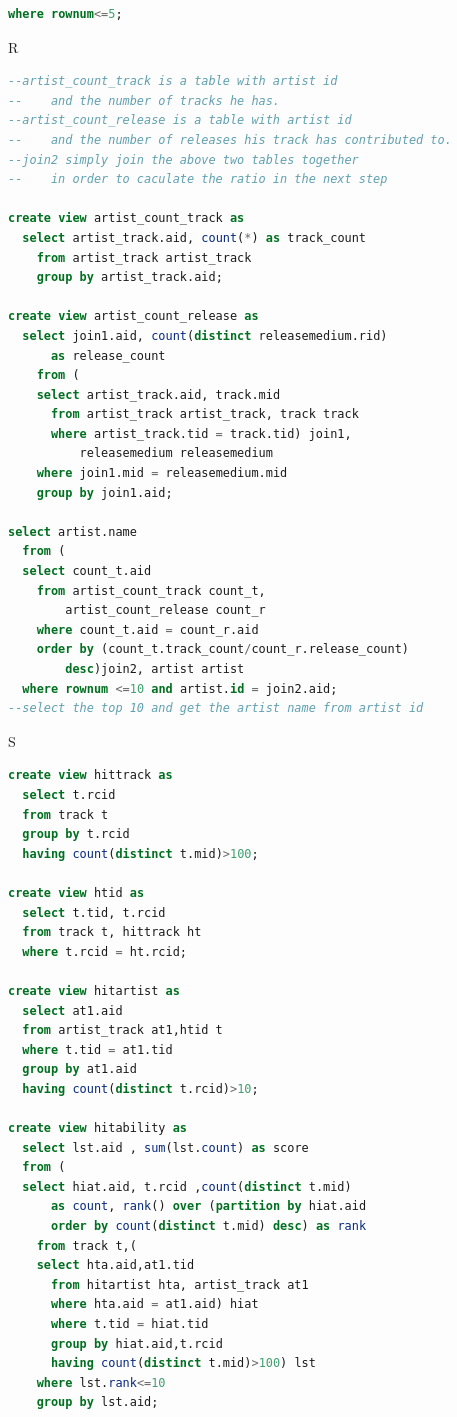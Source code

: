 \documentclass[11pt]{article} %
\begin{document}
{\begin{lstlisting}[language=SQL, keywordstyle=\color{blue!70},
commentstyle=\color{red!50!green!50!blue!50},
rulesepcolor=\color{red!20!green!20!blue!20},
frame=shadowbox]
  where rownum<=5;
\end{lstlisting}
R
\begin{lstlisting}[language=SQL, keywordstyle=\color{blue!70},
commentstyle=\color{red!50!green!50!blue!50},
rulesepcolor=\color{red!20!green!20!blue!20},
frame=shadowbox]
--artist_count_track is a table with artist id
--    and the number of tracks he has.
--artist_count_release is a table with artist id
--    and the number of releases his track has contributed to.
--join2 simply join the above two tables together
--    in order to caculate the ratio in the next step

create view artist_count_track as
  select artist_track.aid, count(*) as track_count
    from artist_track artist_track
    group by artist_track.aid;
            
create view artist_count_release as            
  select join1.aid, count(distinct releasemedium.rid)
      as release_count
    from (
    select artist_track.aid, track.mid
      from artist_track artist_track, track track
      where artist_track.tid = track.tid) join1,
          releasemedium releasemedium
    where join1.mid = releasemedium.mid
    group by join1.aid;
             
select artist.name
  from (
  select count_t.aid
    from artist_count_track count_t,
        artist_count_release count_r
    where count_t.aid = count_r.aid
    order by (count_t.track_count/count_r.release_count)
        desc)join2, artist artist
  where rownum <=10 and artist.id = join2.aid;
--select the top 10 and get the artist name from artist id
\end{lstlisting}
S
\begin{lstlisting}[language=SQL, keywordstyle=\color{blue!70},
commentstyle=\color{red!50!green!50!blue!50},
rulesepcolor=\color{red!20!green!20!blue!20},
frame=shadowbox]
create view hittrack as
  select t.rcid
  from track t
  group by t.rcid
  having count(distinct t.mid)>100;

create view htid as
  select t.tid, t.rcid
  from track t, hittrack ht
  where t.rcid = ht.rcid;

create view hitartist as
  select at1.aid
  from artist_track at1,htid t
  where t.tid = at1.tid
  group by at1.aid
  having count(distinct t.rcid)>10;

create view hitability as
  select lst.aid , sum(lst.count) as score
  from (
  select hiat.aid, t.rcid ,count(distinct t.mid)
      as count, rank() over (partition by hiat.aid
      order by count(distinct t.mid) desc) as rank
    from track t,(
    select hta.aid,at1.tid
      from hitartist hta, artist_track at1
      where hta.aid = at1.aid) hiat
      where t.tid = hiat.tid
      group by hiat.aid,t.rcid 
      having count(distinct t.mid)>100) lst
    where lst.rank<=10 
    group by lst.aid;


\end{lstlisting}}
\end{document}
